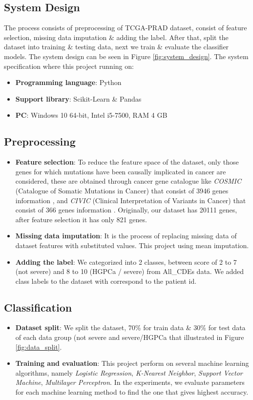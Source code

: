 \documentclass[a4paper,oneside]{article}
\begin{document}
\subsection{System Design}
The process consists of preprocessing of TCGA-PRAD dataset, consist of feature selection, missing data imputation \& adding the label. After that, split the dataset into training \& testing data, next we train \& evaluate the classifier models. The system design can be seen in Figure \ref{fig:system_design}. The system specification where this project running on:
\begin{itemize}
\item \textbf{Programming language}: Python
\item \textbf{Support library}: Scikit-Learn \& Pandas
\item \textbf{PC}: Windows 10 64-bit, Intel i5-7500, RAM 4 GB
\end{itemize}


\subsection{Preprocessing}
\begin{itemize}
\item \textbf{Feature selection}: To reduce the feature space of the dataset, only those genes for which mutations have been causally implicated in cancer are considered, these are obtained through cancer gene catalogue like \textit{COSMIC} (Catalogue of Somatic Mutations in Cancer) that consist of 3946 genes information \cite{cosmicdata}, and \textit{CIVIC} (Clinical Interpretation of Variants in Cancer) that consist of 366 genes information \cite{civicdata}. Originally, our dataset has 20111 genes, after feature selection it has only 821 genes.
\item \textbf{Missing data imputation}: It is the process of replacing missing data of dataset features with substituted values. This project using mean imputation.
\item \textbf{Adding the label}: We categorized into 2 classes, between score of 2 to 7 (not severe) and 8 to 10 (HGPCa / severe)  from All\_CDEs data. We added class labels to the dataset with correspond to the patient id.

\end{itemize}

\subsection{Classification}
\begin{itemize}
\item \textbf{Dataset split}: We split the dataset, 70\% for train data \& 30\% for test data of each data group (not severe and severe/HGPCa that illustrated in Figure \ref{fig:data_split}.
\item \textbf{Training and evaluation}: This project perform on several machine learning algorithms, namely \textit{Logistic Regression}, \textit{K-Nearest Neighbor}, \textit{Support Vector Machine}, \textit{Multilayer Perceptron}. In the experiments, we evaluate parameters for each machine learning method to find the one that gives highest accuracy.
\end{itemize}
\end{document}
